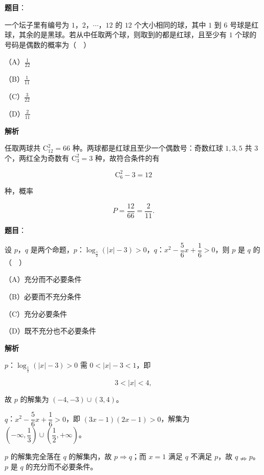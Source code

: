 \begin{answer}

\textbf{题目}：

一个坛子里有编号为 $1$，$2$，$\cdots$，$12$ 的 $12$ 个大小相同的球，其中 $1$ 到 $6$ 号球是红球，其余的是黑球。若从中任取两个球，则取到的都是红球，且至少有 $1$ 个球的号码是偶数的概率为（　）

（A）$\frac1{22}$

（B）$\frac1{11}$

（C）$\frac3{22}$

（D）$\frac2{11}$

\textbf{解析}

任取两球共 $\mathrm C_{12}^2=66$ 种。两球都是红球且至少一个偶数号：奇数红球 $1,3,5$ 共 $3$ 个，两红全为奇数有 $\mathrm C_3^2=3$ 种，故符合条件的有

\nopagebreak[4]
\[\mathrm C_6^2-3=12\]

种，概率

\nopagebreak[4]
\[P=\frac{12}{66}=\frac2{11}.\]


\end{answer}
\begin{answer}

\textbf{题目}：

设 $p$，$q$ 是两个命题，$p$：$\log_{\frac12}(|x|-3)>0$，$q$：$x^2-\dfrac56x+\dfrac16>0$，则 $p$ 是 $q$ 的（　）

（A）充分而不必要条件

（B）必要而不充分条件

（C）充分必要条件

（D）既不充分也不必要条件

\textbf{解析}

$p$：$\log_{\frac12}(|x|-3)>0$ 需 $0<|x|-3<1$，即

\nopagebreak[4]
\[3<|x|<4,\]

故 $p$ 的解集为 $(-4,-3)\cup(3,4)$。

$q$：$x^2-\dfrac56x+\dfrac16>0$，即 $(3x-1)(2x-1)>0$，解集为 $\left(-\infty,\dfrac13\right)\cup\left(\dfrac12,+\infty\right)$。

$p$ 的解集完全落在 $q$ 的解集内，故 $p\Rightarrow q$；而 $x=1$ 满足 $q$ 不满足 $p$，故 $q\nRightarrow p$。$p$ 是 $q$ 的充分而不必要条件。


\end{answer}

